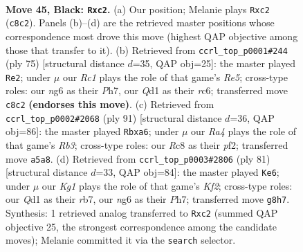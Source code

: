 \documentclass[11pt]{article}
\begin{document}
\clearpage

\begin{figure}[p]\centering
\begin{subfigure}{0.46\textwidth}\centering
\resizebox{\linewidth}{!}{%
\newchessgame
\chessboard[
  setfen={2r3k1/6p1/1p4N1/r2p4/P3p3/R7/2P2PK1/3q4 b - - 1 45},
  showmover=false,
  pgfstyle=straightmove, color=movearrow, markmove={c8-c2}
]}
\caption{}
\end{subfigure}\hfill
\begin{subfigure}{0.46\textwidth}\centering
\resizebox{\linewidth}{!}{%
\newchessgame
\chessboard[
  setfen={8/3r2kp/2R3p1/1p1P4/p3r3/P7/1P5P/1K1R4 b - - 0 38},
  showmover=false,
  pgfstyle=straightmove, color=movearrow, markmove={e4-e2}
]}
\caption{}
\end{subfigure}
\\[4pt]
\begin{subfigure}{0.46\textwidth}\centering
\resizebox{\linewidth}{!}{%
\newchessgame
\chessboard[
  setfen={8/r6k/Pr4p1/7p/R3K2P/6P1/1p3P2/1R6 b - - 1 46},
  showmover=false,
  pgfstyle=straightmove, color=movearrow, markmove={b6-a6}
]}
\caption{}
\end{subfigure}\hfill
\begin{subfigure}{0.46\textwidth}\centering
\resizebox{\linewidth}{!}{%
\newchessgame
\chessboard[
  setfen={3r4/1R1Prk1p/6p1/1p6/4p1PP/4K3/3R4/8 b - - 4 41},
  showmover=false,
  pgfstyle=straightmove, color=movearrow, markmove={f7-e6}
]}
\caption{}
\end{subfigure}
\caption{\textbf{Move 45, Black: \texttt{Rxc2}.} (a) Our position; Melanie plays \texttt{Rxc2} (\texttt{c8c2}). Panels (b)--(d) are the retrieved master positions whose correspondence most drove this move (highest QAP objective among those that transfer to it). (b) Retrieved from \texttt{ccrl\_top\_p0001\#244} (ply 75) [structural distance $d$=35, QAP obj=25]: the master played \texttt{Re2}; under $\mu$ our \emph{Rc1} plays the role of that game's \emph{Re5}; cross-type roles: our \emph{n}g6 as their \emph{P}h7, our \emph{Q}d1 as their \emph{r}c6; transferred move \texttt{c8c2} \textbf{(endorses this move)}. (c) Retrieved from \texttt{ccrl\_top\_p0002\#2068} (ply 91) [structural distance $d$=36, QAP obj=86]: the master played \texttt{Rbxa6}; under $\mu$ our \emph{Ra4} plays the role of that game's \emph{Rb3}; cross-type roles: our \emph{R}c8 as their \emph{p}f2; transferred move \texttt{a5a8}. (d) Retrieved from \texttt{ccrl\_top\_p0003\#2806} (ply 81) [structural distance $d$=33, QAP obj=84]: the master played \texttt{Ke6}; under $\mu$ our \emph{Kg1} plays the role of that game's \emph{Kf2}; cross-type roles: our \emph{Q}d1 as their \emph{r}b7, our \emph{n}g6 as their \emph{P}h7; transferred move \texttt{g8h7}. Synthesis: 1 retrieved analog transferred to \texttt{Rxc2} (summed QAP objective 25, the strongest correspondence among the candidate moves); Melanie committed it via the \texttt{search} selector.}
\label{fig:thought-m89}
\end{figure}
\end{document}
